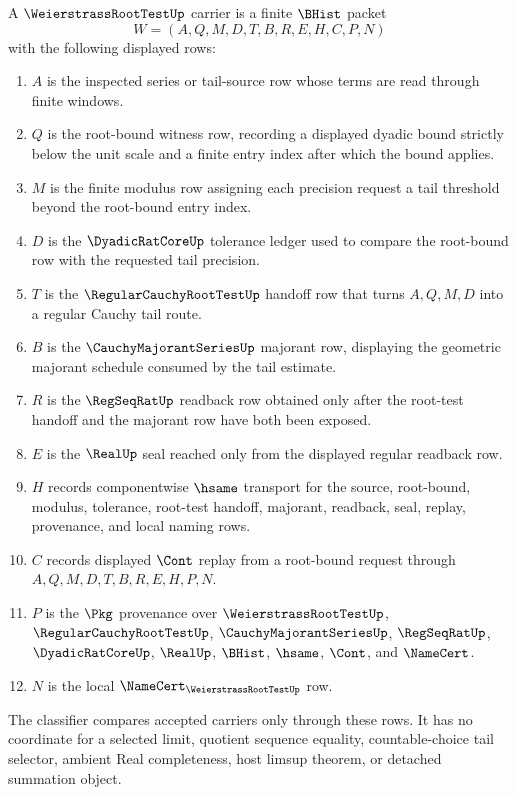 \begin{definition}
\label{def:weierstrass-root-test-carrier}
A $\WeierstrassRootTestUp$ carrier is a finite $\BHist$ packet
$$
W=(A,Q,M,D,T,B,R,E,H,C,P,N)
$$
with the following displayed rows:
\begin{enumerate}
\item $A$ is the inspected series or tail-source row whose terms are read through finite windows.
\item $Q$ is the root-bound witness row, recording a displayed dyadic bound strictly below the unit scale and a finite entry index after which the bound applies.
\item $M$ is the finite modulus row assigning each precision request a tail threshold beyond the root-bound entry index.
\item $D$ is the $\DyadicRatCoreUp$ tolerance ledger used to compare the root-bound row with the requested tail precision.
\item $T$ is the $\RegularCauchyRootTestUp$ handoff row that turns $A,Q,M,D$ into a regular Cauchy tail route.
\item $B$ is the $\CauchyMajorantSeriesUp$ majorant row, displaying the geometric majorant schedule consumed by the tail estimate.
\item $R$ is the $\RegSeqRatUp$ readback row obtained only after the root-test handoff and the majorant row have both been exposed.
\item $E$ is the $\RealUp$ seal reached only from the displayed regular readback row.
\item $H$ records componentwise $\hsame$ transport for the source, root-bound, modulus, tolerance, root-test handoff, majorant, readback, seal, replay, provenance, and local naming rows.
\item $C$ records displayed $\Cont$ replay from a root-bound request through $A,Q,M,D,T,B,R,E,H,P,N$.
\item $P$ is the $\Pkg$ provenance over $\WeierstrassRootTestUp$, $\RegularCauchyRootTestUp$, $\CauchyMajorantSeriesUp$, $\RegSeqRatUp$, $\DyadicRatCoreUp$, $\RealUp$, $\BHist$, $\hsame$, $\Cont$, and $\NameCert$.
\item $N$ is the local $\NameCert_{\WeierstrassRootTestUp}$ row.
\end{enumerate}
The classifier compares accepted carriers only through these rows. It has no coordinate for a selected limit, quotient sequence equality, countable-choice tail selector, ambient Real completeness, host limsup theorem, or detached summation object.
\end{definition}

